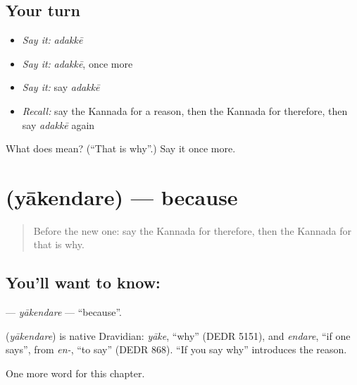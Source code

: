 \subsection*{Your turn}
\begin{itemize}
\raggedright
  \item \emph{Say it:} \emph{adakkē}
  \item \emph{Say it:} \emph{adakkē}, once more
  \item \emph{Say it:} say \emph{adakkē}
  \item \emph{Recall:} say the Kannada for a reason, then the Kannada for therefore, then say \emph{adakkē} again
\end{itemize}

\begin{tcolorbox}[breakable,colback=teal!4,colframe=teal!35!black,title={Before you move on}]
What does  mean? (\textquotedblleft{}That is why\textquotedblright{}.) Say it once more.
\end{tcolorbox}
\section[\texorpdfstring{\kn{ಯಾಕೆಂದರೆ} (yākendare)}{ಯಾಕೆಂದರೆ (yākendare)}]{ (yākendare) — because}

\label{lesson:KA-C115-yakendare}



\begin{quote}
Before the new one: say the Kannada for therefore, then the Kannada for that is why.
\end{quote}

\subsection*{You'll want to know: }
\textbf{} — \emph{yākendare} — \textquotedblleft{}because\textquotedblright{}.

\begin{cousinweb}
\textbf{} (\emph{yākendare}) is native Dravidian: \emph{yāke}, \textquotedblleft{}why\textquotedblright{} (DEDR 5151), and \emph{endare}, \textquotedblleft{}if one says\textquotedblright{}, from \emph{en-}, \textquotedblleft{}to say\textquotedblright{} (DEDR 868). \textquotedblleft{}If you say why\textquotedblright{} introduces the reason.
\end{cousinweb}

\begin{grammarlens}[title={What you've built}]
One more word for this chapter.
\end{grammarlens}

